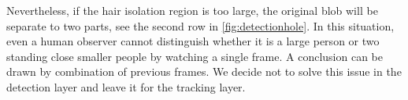 Nevertheless, if the hair isolation region is too large, the original blob will be separate to two parts, see the second row in \autoref{fig:detectionhole}. In this situation, even a human observer cannot distinguish whether it is a large person or two standing close smaller people by watching a single frame. A conclusion can be drawn by combination of previous frames. We decide not to solve this issue in the detection layer and leave it for the tracking layer.